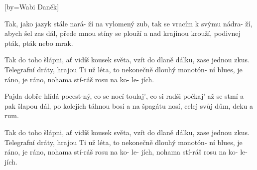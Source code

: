 [by={Wabi Daněk}]

\beginverse{}
Tak, jako jazyk stále nará- ží na vylomený zub,
tak se vracím k svýmu nádra- ží, abych šel zas dál,
přede mnou stíny se plouží a nad krajinou krouží,
podivnej pták, pták nebo mrak.
\endverse{}

\beginchorus{}
Tak do toho šlápni, ať vidíš kousek světa,
vzít do dlaně dálku, zase jednou zkus.
Telegrafní dráty, hrajou Ti už léta,
to nekonečně dlouhý monotón- ní blues,
je ráno, je ráno, nohama stí-ráš rosu na ko- le- jích.
\endchorus{}

\beginverse{}
\chordsoff{}
Pajda dobře hlídá pocest-ný, co se nocí toulaj',
co si radši počkaj' až se stmí a pak šlapou dál,
po kolejích táhnou bosí a na špagátu nosí,
celej svůj dům,  deku a rum.
\chordson{}
\endverse{}

\beginchorus{}
\chordsoff{}
Tak do toho šlápni, ať vidíš kousek světa,
vzít do dlaně dálku, zase jednou zkus.
Telegrafní dráty, hrajou Ti už léta,
to nekonečně dlouhý monotón- ní blues,
je ráno, je ráno, nohama stí-ráš rosu na ko- le- jích,
nohama stí-ráš rosu na ko- le- jích.
\chordson{}
\endchorus{}

\endsong{}

